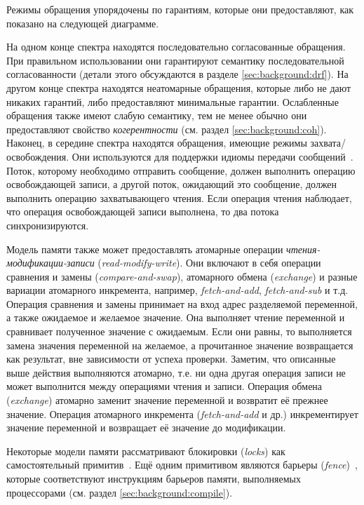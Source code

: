 Режимы обращения упорядочены по гарантиям, 
которые они предоставляют, как показано на следующей диаграмме. 



На одном конце спектра находятся последовательно согласованные обращения.
При правильном использовании они гарантируют семантику 
последовательной согласованности
(детали этого обсуждаются в разделе \cref{sec:background:drf}).
На другом конце  спектра находятся неатомарные обращения, которые либо не дают никаких гарантий, 
либо предоставляют минимальные гарантии. 
Ослабленные обращения также имеют слабую семантику, 
тем не менее обычно они предоставляют свойство \emph{когерентности}
(см. раздел \cref{sec:background:coh}).
Наконец, в середине спектра находятся обращения, имеющие режимы захвата/освобождения. 
Они используются для поддержки идиомы передачи сообщений~\cite{Lahav-al:POPL16}.
Поток, которому необходимо отправить сообщение, должен выполнить операцию освобождающей записи, 
а другой поток, ожидающий это сообщение, должен выполнить операцию захватывающего чтения. 
Если операция чтения наблюдает, что  операция освобождающей записи выполнена, то два потока синхронизируются.

Модель памяти также может предоставлять атомарные операции 
\emph{чтения-модификации-записи} (\emph{read-modify-write}).
Они включают в себя операции сравнения и замены (\emph{compare-and-swap}), 
атомарного обмена (\emph{exchange}) и разные вариации атомарного инкремента, 
например, \emph{fetch-and-add}, \emph{fetch-and-sub} и т.д. 
Операция сравнения и замены принимает на вход 
адрес разделяемой переменной, а также ожидаемое и желаемое значение.
Она выполняет чтение переменной и сравнивает полученное значение 
с ожидаемым. Если они равны, то выполняется замена значения переменной 
на желаемое, а прочитанное значение возвращается как результат, 
вне зависимости от успеха проверки. 
Заметим, что описанные выше действия выполняются атомарно, т.е.
ни одна другая операция записи не может выполнится между 
операциями чтения и записи.
Операция обмена (\emph{exchange}) атомарно 
заменит значение переменной и возвратит её прежнее значение. 
Операция атомарного инкремента (\emph{fetch-and-add} и др.) 
инкрементирует значение переменной и
возвращает её значение  до модификации.  

Некоторые модели памяти рассматривают 
блокировки (\emph{locks}) как самостоятельный примитив~\cite{Manson-al:POPL05}. 
Ещё одним примитивом являются барьеры (\emph{fence})~\cite{Batty-al:POPL11},
которые соответствуют инструкциям барьеров памяти, 
выполняемых процессорами  
(см. раздел \cref{sec:background:compile}). 

